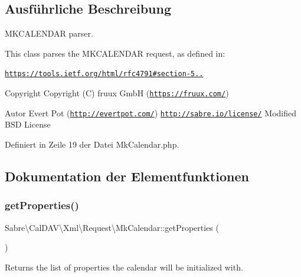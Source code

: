 \subsection{Ausführliche Beschreibung}
M\+K\+C\+A\+L\+E\+N\+D\+AR parser.

This class parses the M\+K\+C\+A\+L\+E\+N\+D\+AR request, as defined in\+:

\href{https://tools.ietf.org/html/rfc4791#section-5.3.1}{\tt https\+://tools.\+ietf.\+org/html/rfc4791\#section-\/5..}

\begin{DoxyCopyright}{Copyright}
Copyright (C) fruux GmbH (\href{https://fruux.com/}{\tt https\+://fruux.\+com/}) 
\end{DoxyCopyright}
\begin{DoxyAuthor}{Autor}
Evert Pot (\href{http://evertpot.com/}{\tt http\+://evertpot.\+com/})  \href{http://sabre.io/license/}{\tt http\+://sabre.\+io/license/} Modified B\+SD License 
\end{DoxyAuthor}


Definiert in Zeile 19 der Datei Mk\+Calendar.\+php.



\subsection{Dokumentation der Elementfunktionen}
\mbox{\label{class_sabre_1_1_cal_d_a_v_1_1_xml_1_1_request_1_1_mk_calendar_a3317d270aa072febbfdff2f0f8850b73}} 
\subsubsection{\texorpdfstring{get\+Properties()}{getProperties()}}
{\footnotesize\ttfamily Sabre\textbackslash{}\+Cal\+D\+A\+V\textbackslash{}\+Xml\textbackslash{}\+Request\textbackslash{}\+Mk\+Calendar\+::get\+Properties (\begin{DoxyParamCaption}{ }\end{DoxyParamCaption})}

Returns the list of properties the calendar will be initialized with.

